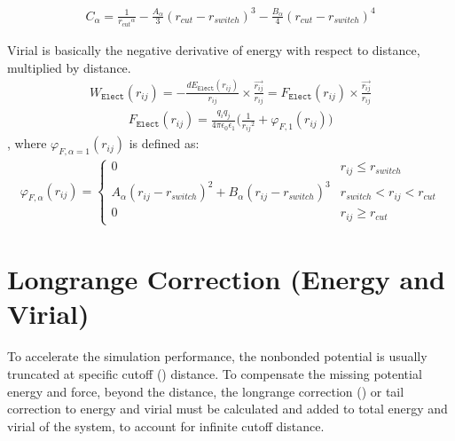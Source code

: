 \documentclass[letterpaper,10pt,english]{sphinxmanual}
\begin{document}
\begin{description}
\begin{equation*}
\begin{split}C_{\alpha} =  \frac{1}{{r_{cut}}^{\alpha}} -\frac{A_{\alpha}}{3} (r_{cut} - r_{switch})^3 -\frac{B_{\alpha}}{4} (r_{cut} - r_{switch})^4\end{split}
\end{equation*}
\item[{\sphinxcode{\sphinxupquote{Virial Calculation}}}] \leavevmode
\sphinxAtStartPar
Virial is basically the negative derivative of energy with respect to distance, multiplied by distance.
\begin{equation*}
\begin{split}W_{\texttt{Elect}}(r_{ij}) = -\frac{dE_{\texttt{Elect}}(r_{ij})}{r_{ij}}\times \frac{\overrightarrow{r_{ij}}}{{r_{ij}}} = F_{\texttt{Elect}}(r_{ij}) \times \frac{\overrightarrow{r_{ij}}}{{r_{ij}}}\end{split}
\end{equation*}\begin{equation*}
\begin{split}F_{\texttt{Elect}}(r_{ij})=\frac{q_iq_j}{4\pi\epsilon_0\epsilon_1}\bigg(\frac{1}{{r_{ij}}^2}+\varphi_{F, 1}(r_{ij})\bigg)\end{split}
\end{equation*}
\sphinxAtStartPar
, where \(\varphi_{F, \alpha = 1} (r_{ij})\) is defined as:
\begin{equation*}
\begin{split}\varphi_{F, \alpha}(r_{ij}) =
\begin{cases}
  0 & r_{ij} \leq r_{switch} \\
  A_{\alpha} (r_{ij} - r_{switch})^2 + B_{\alpha} (r_{ij} - r_{switch})^3 & r_{switch} < r_{ij} < r_{cut} \\
  0 & r_{ij} \geq r_{cut}
\end{cases}\end{split}
\end{equation*}
\end{description}


\chapter{Long\sphinxhyphen{}range Correction (Energy and Virial)}
\label{\detokenize{long_range_correction:long-range-correction-energy-and-virial}}\label{\detokenize{long_range_correction::doc}}
\sphinxAtStartPar
To accelerate the simulation performance, the nonbonded potential is usually truncated at specific cut\sphinxhyphen{}off () distance.
To compensate the missing potential energy and force, beyond the  distance, the long\sphinxhyphen{}range correction () or tail correction to energy and virial must be
calculated and added to total energy and virial of the system, to account for infinite cutoff distance.
\end{document}

